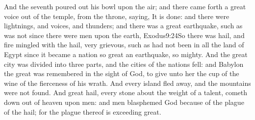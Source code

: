 And the seventh poured out his bowl upon the air; and there came forth a great voice out of the temple,%
 from the throne, saying, It is done: 
 and there were lightnings, and voices, and thunders; and there was a great earthquake, such as was not since there were men upon the earth,%
					{Exodus}{9:24}{So there was hail, and fire mingled with the hail, very grievous, such as had not been in all the land of Egypt since it became a nation}
 so great an earthquake, so mighty. 
 And the great city was divided into three parts, and the cities of the nations fell: and Babylon the great was remembered in the sight of God, to give unto her the cup of the wine of the fierceness of his wrath. 
 And every island fled away, and the mountains were not found. 
 And great hail, every stone about the weight of a talent, cometh down out of heaven upon men: and men blasphemed God because of the plague of the hail; for the plague thereof is exceeding great.